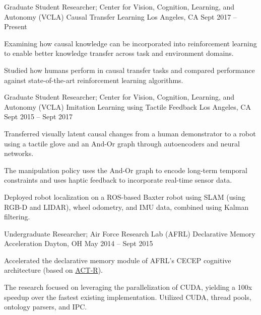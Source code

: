 


\begin{cventries}


\cventry
{Graduate Student Researcher; Center for Vision, Cognition, Learning, and Autonomy (VCLA)}
{Causal Transfer Learning}
{Los Angeles, CA}
{Sept 2017 – Present}
{
\begin{cvitems}
\item Examining how causal knowledge can be incorporated into reinforcement learning to enable better knowledge transfer across task and environment domains.
\item Studied how humans perform in causal transfer tasks and compared performance against state-of-the-art reinforcement learning algorithms.
\end{cvitems}
}


\cventry
{Graduate Student Researcher; Center for Vision, Cognition, Learning, and Autonomy (VCLA)}
{Imitation Learning using Tactile Feedback}
{Los Angeles, CA}
{Sept 2015 – Sept 2017}
{
\begin{cvitems}
\item Transferred visually latent causal changes from a human demonstrator to a robot using a tactile glove and an And-Or graph through autoencoders and neural networks.
\item The manipulation policy uses the And-Or graph to encode long-term temporal constraints and uses haptic feedback to incorporate real-time sensor data. 
\item Deployed robot localization on a ROS-based Baxter robot using SLAM (using RGB-D and LIDAR), wheel odometry, and IMU data, combined using Kalman filtering.
\end{cvitems}
}


\cventry
{Undergraduate Researcher; Air Force Research Lab (AFRL)}
{Declarative Memory Acceleration}
{Dayton, OH}
{May 2014 – Sept 2015}
{
\begin{cvitems}
\item Accelerated the declarative memory module of AFRL's CECEP cognitive architecture (based on \href{http://act-r.psy.cmu.edu/}{ACT-R}).
\item The research focused on leveraging the parallelization of CUDA, yielding a 100x speedup over the fastest existing implementation. Utilized CUDA, thread pools, ontology parsers, and IPC.
\end{cvitems}
}


\end{cventries}